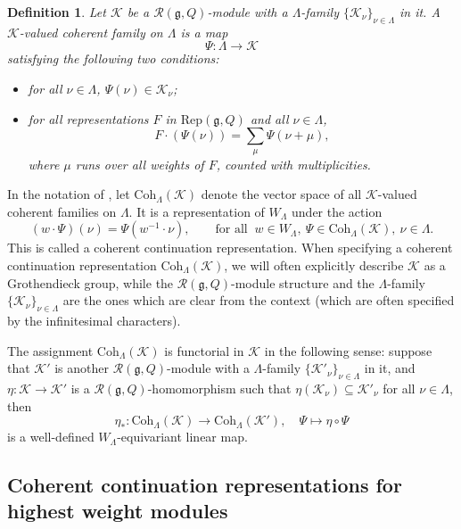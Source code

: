 \documentclass[12pt,a4paper]{amsart}
\def\subset{\subseteq}
\newcommand{\CK}{{\mathcal {K}}}
\newcommand{\g}{\mathfrak g}
\numberwithin{equation}{section}
\newtheorem{defn}[thm]{Definition}
\theoremstyle{remark}
\def\Coh{\mathrm{Coh}}
\begin{document}
\begin{defn}\label{defcoh00}
  Let $\CK$ be  a $\mathcal R(\g, Q)$-module  with a $\Lambda$-family $\{\CK_\nu\}_{\nu\in \Lambda}$ in it.
  A $\CK$-valued coherent family on
  $\Lambda$ is a map
  \[
    \Psi: \Lambda\rightarrow \CK%
  \]
  satisfying the following two conditions:
  \begin{itemize}
    \item for all $\nu\in \Lambda$, $\Psi(\nu)\in \CK_\nu$;
    \item for all representations $F$ in $\mathrm{Rep}(\g, Q)$
          and all $\nu\in \Lambda$,
          \[
          F \cdot (\Psi(\nu)) = \sum_{\mu} \Psi(\nu+\mu),
          \]
          where $\mu$ runs over all weights of $F$, counted with multiplicities.%
  \end{itemize}
\end{defn}


In the notation of , let $\Coh_{\Lambda}(\CK)$ denote the
vector space of all $\mathcal K$-valued coherent families on $\Lambda$. It is a
representation of $W_{\Lambda}$ under the action
\[
  (w \cdot \Psi)(\nu) = \Psi(w^{-1}\cdot \nu), \qquad \textrm{for all
  }\ w\in W_\Lambda, \ \Psi\in \Coh_{\Lambda}(\CK), \   \nu\in \Lambda.
\]
This is called a coherent continuation representation. When specifying a coherent continuation representation $\Coh_{\Lambda}(\CK)$, we will often explicitly describe $\CK$ as a Grothendieck group, while the $\mathcal R(\g, Q)$-module structure and the $\Lambda$-family  $\{\CK_\nu\}_{\nu\in \Lambda}$ are the ones which are clear from the context (which are often specified by the infinitesimal characters).

The assignment $\Coh_{\Lambda}(\CK)$ is functorial in $\CK$ in the following sense: suppose that $\CK'$ is another  $\mathcal R(\g, Q)$-module  with a $\Lambda$-family $\{\CK'_\nu\}_{\nu\in \Lambda}$ in it, and $\eta: \CK\rightarrow \CK'$ is a $\mathcal R(\g, Q)$-homomorphism such that $\eta(\CK_\nu)\subset \CK'_\nu$ for all $\nu\in \Lambda$, then
\[
 \eta_*: \Coh_{\Lambda}(\CK)\rightarrow \Coh_{\Lambda}(\CK'), \quad \Psi\mapsto \eta\circ \Psi
\]
is a well-defined $W_\Lambda$-equivariant linear map.


\newcommand{\Rep}{\mathrm{Rep}}




\subsection{Coherent continuation representations for highest weight modules}
\end{document}
